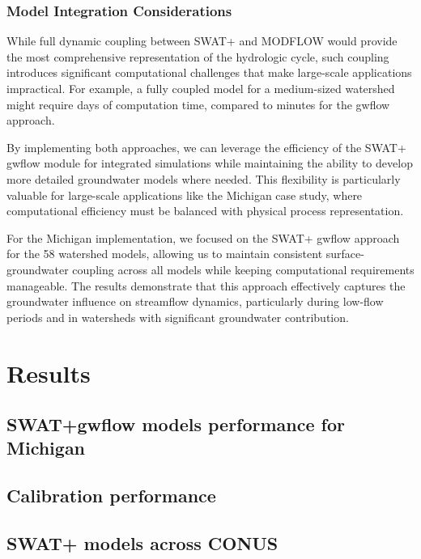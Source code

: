 \documentclass[final,3p,times]{elsarticle}
\begin{document}
\subsubsection{Model Integration Considerations}
While full dynamic coupling between SWAT+ and MODFLOW would provide the most comprehensive representation of the hydrologic cycle, such coupling introduces significant computational challenges that make large-scale applications impractical. For example, a fully coupled model for a medium-sized watershed might require days of computation time, compared to minutes for the gwflow approach.

By implementing both approaches, we can leverage the efficiency of the SWAT+ gwflow module for integrated simulations while maintaining the ability to develop more detailed groundwater models where needed. This flexibility is particularly valuable for large-scale applications like the Michigan case study, where computational efficiency must be balanced with physical process representation.

For the Michigan implementation, we focused on the SWAT+ gwflow approach for the 58 watershed models, allowing us to maintain consistent surface-groundwater coupling across all models while keeping computational requirements manageable. The results demonstrate that this approach effectively captures the groundwater influence on streamflow dynamics, particularly during low-flow periods and in watersheds with significant groundwater contribution.

\section{Results}
\label{sec:results}

\subsection{SWAT+gwflow models performance for Michigan}
\label{subsec:michigan_performance}

\subsection{Calibration performance}
\label{subsec:calibration}

\subsection{SWAT+ models across CONUS}
\label{subsec:conus_models}
\end{document}
